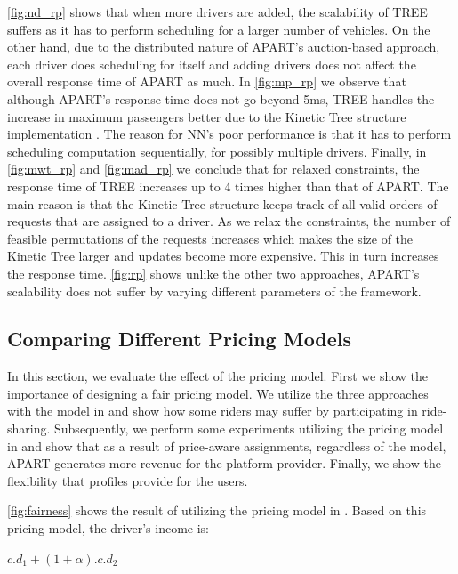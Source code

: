 \vspace{-3mm}
\cref{fig:nd_rp} shows that when more drivers are added, the scalability of TREE suffers as it has to perform scheduling for a larger number of vehicles. On the other hand, due to the distributed nature of APART's auction-based approach, each driver does scheduling for itself and adding drivers does not affect the overall response time of APART as much. In \cref{fig:mp_rp} we observe that although APART's response time does not go beyond 5ms, TREE handles the increase in maximum passengers better due to the Kinetic Tree structure implementation \cite{Huang14}. The reason for NN's poor performance is that it has to perform scheduling computation sequentially, for possibly multiple drivers. Finally, in \cref{fig:mwt_rp} and \cref{fig:mad_rp} we conclude that for relaxed constraints, the response time of TREE increases up to 4 times higher than that of APART. The main reason is that the Kinetic Tree structure keeps track of all valid orders of requests that are assigned to a driver. As we relax the constraints, the number of feasible permutations of the requests increases which makes the size of the Kinetic Tree larger and updates become more expensive. This in turn increases the response time. \cref{fig:rp} shows unlike the other two approaches, APART's scalability does not suffer by varying different parameters of the framework.

\subsection{Comparing Different Pricing Models}
\label{subsec:pricingexp}

In this section, we evaluate the effect of the pricing model. First we show the importance of designing a fair pricing model. We utilize the three approaches with the model in \cite{Ma13} and show how some riders may suffer by participating in ride-sharing. Subsequently, we perform some experiments utilizing the pricing model in \cite{Ma15} and show that as a result of price-aware assignments, regardless of the model, APART generates more revenue for the platform provider. Finally, we show the flexibility that profiles provide for the users. 

\cref{fig:fairness} shows the result of utilizing the pricing model in \cite{Ma13}. Based on this pricing model, the driver's income is:

\vspace{-2mm}
\begin{center}
$c.d_1 + (1+\alpha).c.d_2$
\end{center}
\vspace{-2mm}

